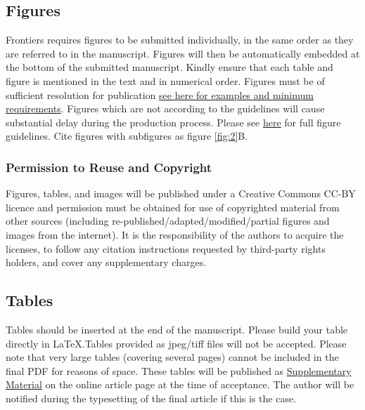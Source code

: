 \documentclass[utf8]{frontiersSCNS} %
\begin{document}
\subsection{Figures}
Frontiers requires figures to be submitted individually, in the same order as they are referred to in the manuscript. Figures will then be automatically embedded at the bottom of the submitted manuscript. Kindly ensure that each table and figure is mentioned in the text and in numerical order. Figures must be of sufficient resolution for publication \href{http://home.frontiersin.org/about/author-guidelines#ResolutionRequirements}{see here for examples and minimum requirements}. Figures which are not according to the guidelines will cause substantial delay during the production process. Please see \href{http://home.frontiersin.org/about/author-guidelines#GeneralStyleGuidelinesforFigures}{here} for full figure guidelines. Cite figures with subfigures as figure \ref{fig:2}B.


\subsubsection{Permission to Reuse and Copyright}
Figures, tables, and images will be published under a Creative Commons CC-BY licence and permission must be obtained for use of copyrighted material from other sources (including re-published/adapted/modified/partial figures and images from the internet). It is the responsibility of the authors to acquire the licenses, to follow any citation instructions requested by third-party rights holders, and cover any supplementary charges.

\subsection{Tables}
Tables should be inserted at the end of the manuscript. Please build your table directly in LaTeX.Tables provided as jpeg/tiff files will not be accepted. Please note that very large tables (covering several pages) cannot be included in the final PDF for reasons of space. These tables will be published as \href{http://home.frontiersin.org/about/author-guidelines#SupplementaryMaterial}{Supplementary Material} on the online article page at the time of acceptance. The author will be notified during the typesetting of the final article if this is the case. 
\end{document}

